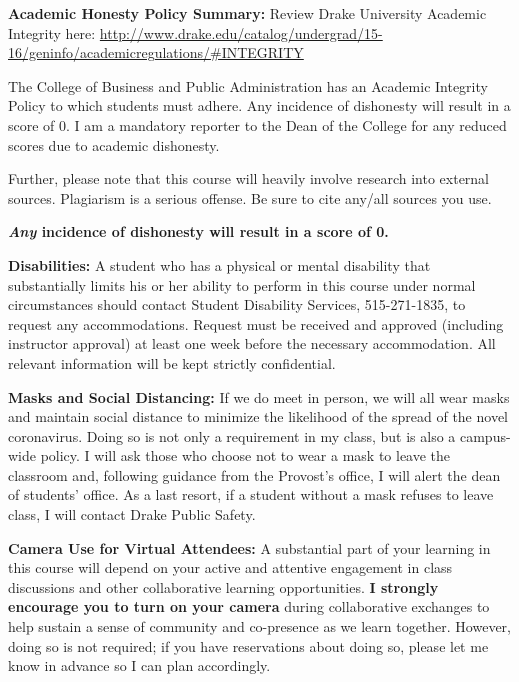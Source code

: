 \documentclass[11pt]{article}\usepackage[]{graphicx}\usepackage[]{color}
\begin{document}
\textbf {\large Academic Honesty Policy Summary:} 
Review Drake University Academic Integrity here:
\url{http://www.drake.edu/catalog/undergrad/15-16/geninfo/academicregulations/#INTEGRITY}

The College of Business and Public Administration has an Academic Integrity Policy to which students must adhere. Any incidence of dishonesty will result in a score of 0.  I am a mandatory reporter to the Dean of the College for any reduced scores due to academic dishonesty.


Further, please note that this course will heavily involve research into external sources. Plagiarism is a serious offense. Be sure to cite any/all sources you use.

 \textbf{\textit{Any} incidence of dishonesty will result in a score of 0.}
\vspace{1cm}

\textbf {\large Disabilities:} 
A student who has a physical or mental disability that substantially limits his or her ability to perform in this course under normal circumstances should contact Student Disability Services, 515-271-1835, to request any accommodations. Request must be received and approved (including instructor approval) at least one week before the necessary accommodation. All relevant information will be kept strictly confidential.
\vspace{1cm}

\textbf{\large Masks and Social Distancing:}
If we do meet in person, we will all wear masks and maintain social distance to minimize the likelihood of the spread of the novel coronavirus. Doing so is not only a requirement in my class, but is also a campus-wide policy. I will ask those who choose not to wear a mask to leave the classroom and, following guidance from the Provost’s office, I will alert the dean of students’ office. As a last resort, if a student without a mask refuses to leave class, I will contact Drake Public Safety.  
 \vspace{1cm}

\textbf{\large Camera Use for Virtual Attendees:} A substantial part of your learning in this course will depend on your active and attentive engagement in class discussions and other collaborative learning opportunities. \textbf{I strongly encourage you to turn on your camera} during collaborative exchanges to help sustain a sense of community and co-presence as we learn together. However, doing so is not required; if you have reservations about doing so, please let me know in advance so I can plan accordingly.  
\end{document}

